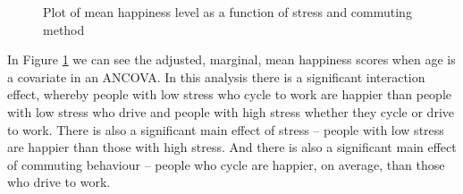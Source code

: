 \begin{figure}[!htb]
\begin{center}
\caption{Plot of mean happiness level as a function of stress and commuting method}
\label{fig:ancova4}
\HR
\end{center}
\end{figure}

In Figure \ref{fig:ancova4} we can see the adjusted, marginal, mean happiness scores when age is a covariate in an ANCOVA. In this analysis there is a significant interaction effect, whereby people with low stress who cycle to work are happier than people with low stress who drive and people with high stress whether they cycle or drive to work. There is also a significant main effect of stress – people with low stress are happier than those with high stress. And there is also a significant main effect of commuting behaviour – people who cycle are happier, on average, than those who drive to work.  

\begin{comment} %
One thing to be aware of is that, if you are thinking of including a covariate in your ANOVA, there is an additional assumption: the relationship between the covariate and the dependent variable should be similar for all levels of the independent variable. This can be checked by adding an interaction term between the covariate and each independent variable in the JASP \rtext{Model - Model terms} option. If the interaction effect is not significant it can be removed. If it is significant then a different and more advanced statistical technique might be appropriate (which is beyond the scope of this book so you might want to consult a friendly statistician).
\end{comment}



